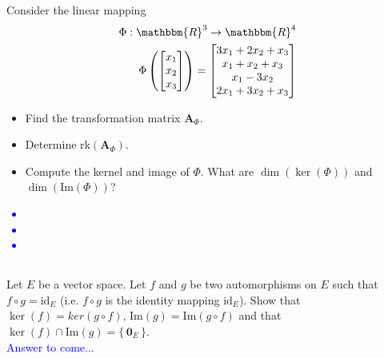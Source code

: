 \documentclass[a4paper,12pt]{article}
\newcommand{\Br}[1]{\{\, #1 \,\}}
\newcommand{\R}{\mathbbm{R}}
\newcommand{\M}[1]{ \begin{bmatrix} #1 \end{bmatrix} }
\newcommand{\vsp}[1]{\vspace{#1mm}\\}
\newcommand{\veco}{\textbf{0}}
\newcommand{\matA}{\textbf{A}}
\newcommand{\image}{\textrm{Im}}
\begin{document}
\subsection{}
Consider the linear mapping
\begin{align*}
\Phi: \R^3 \rightarrow \R^4 \\
\Phi \left(\M{x_1\\x_2\\x_3}\right) = \M{3x_1+2x_2+x_3\\x_1+x_2+x_3\\x_1-3x_2\\2x_1+3x_2+x_3}
\end{align*}
\begin{itemize}
 \item Find the transformation matrix $\matA_\Phi$.
 \item Determine rk$(\matA_\Phi)$.
 \item Compute the kernel and image of $\Phi$. What are $\dim(\ker(\Phi))$ and $\dim(\image(\Phi))$?
\end{itemize}
\textcolor{blue}{
\begin{itemize}
 \item
 \item
 \item
\end{itemize}
}
\subsection{}
Let $E$ be a vector space. Let $f$ and $g$ be two automorphisms on $E$ such that $f \circ g = \textrm{id}_E$ (i.e. $f \circ g$ is the identity mapping $\textrm{id}_E$). Show that $\ker(f) = ker(g \circ f), \, \image(g) = \image(g \circ f)$ and that $\ker(f) \cap \image(g) = \Br{\veco_E}$.
\vsp{3}
\textcolor{blue}{
Answer to come...
}
\end{document}
